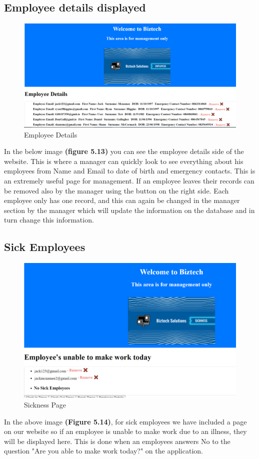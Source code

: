 \subsection{Employee details displayed}
\begin{figure}[!htb]
    \includegraphics[scale=0.5]{img/EmployeeDetails.PNG}
    \caption{Employee Details}
    \label{fig}
\end{figure}
In the below image \textbf{(figure 5.13)} you can see the employee details side of the website. This is where a manager can quickly look to see everything about his employees from Name and Email to date of birth and emergency contacts. This is an extremely useful page for management. If an employee leaves their records can be removed also by the manager using the button on the right side. Each employee only has one record, and this can again be changed in the manager section by the manager which will update the information on the database and in turn change this information.
\FloatBarrier

\subsection{Sick Employees}
\begin{figure}[!htb]
    \centering
    \includegraphics[scale=0.60]{img/Sickness.PNG}
    \caption{Sickness Page}
    \label{fig}
\end{figure}
In the above image \textbf{(Figure 5.14)}, for sick employees we have included a page on our website so if an employee is unable to make work due to an illness, they will be displayed here. This is done when an employees answers No to the question "Are you able to make work today?" on the application.
\FloatBarrier

